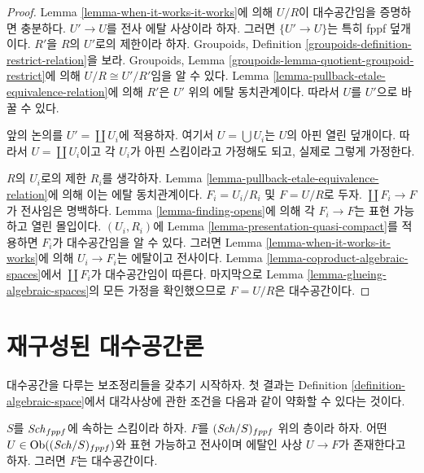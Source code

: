 \begin{proof}
Lemma \ref{lemma-when-it-works-it-works}에 의해 $U/R$이 대수공간임을
증명하면 충분하다. $U' \to U$를 전사 에탈 사상이라 하자.
그러면 $\{U' \to U\}$는 특히 fppf 덮개이다.
$R'$을 $R$의 $U'$로의 제한이라 하자. Groupoids, Definition
\ref{groupoids-definition-restrict-relation}을 보라.
Groupoids, Lemma \ref{groupoids-lemma-quotient-groupoid-restrict}에
의해 $U/R \cong U'/R'$임을 알 수 있다. Lemma
\ref{lemma-pullback-etale-equivalence-relation}에 의해 $R'$은
$U'$ 위의 에탈 동치관계이다. 따라서 $U$를 $U'$으로 바꿀 수 있다.

\medskip\noindent
앞의 논의를 $U' = \coprod U_i$에 적용하자. 여기서
$U = \bigcup U_i$는 $U$의 아핀 열린 덮개이다. 따라서
$U = \coprod U_i$이고 각 $U_i$가 아핀 스킴이라고 가정해도 되고,
실제로 그렇게 가정한다.

\medskip\noindent
$R$의 $U_i$로의 제한 $R_i$를 생각하자. Lemma
\ref{lemma-pullback-etale-equivalence-relation}에 의해 이는 에탈
동치관계이다. $F_i = U_i/R_i$ 및 $F = U/R$로 두자.
$\coprod F_i \to F$가 전사임은 명백하다. Lemma
\ref{lemma-finding-opens}에 의해 각 $F_i \to F$는 표현 가능하고
열린 몰입이다. $(U_i, R_i)$에 Lemma
\ref{lemma-presentation-quasi-compact}를 적용하면 $F_i$가 대수공간임을
알 수 있다. 그러면 Lemma \ref{lemma-when-it-works-it-works}에 의해
$U_i \to F_i$는 에탈이고 전사이다. Lemma
\ref{lemma-coproduct-algebraic-spaces}에서 $\coprod F_i$가 대수공간임이
따른다. 마지막으로 Lemma \ref{lemma-glueing-algebraic-spaces}의 모든
가정을 확인했으므로 $F = U/R$은 대수공간이다.
\end{proof}










\section{재구성된 대수공간론}
\label{section-algebraic-spaces-retrofitted}

\noindent
대수공간을 다루는 보조정리들을 갖추기 시작하자. 첫 결과는 Definition
\ref{definition-algebraic-space}에서 대각사상에 관한 조건을 다음과 같이
약화할 수 있다는 것이다.

\begin{lemma}
\label{lemma-etale-locally-representable-gives-space}
$S$를 $\mathit{Sch}_{fppf}$에 속하는 스킴이라 하자.
$F$를 $(\mathit{Sch}/S)_{fppf}$ 위의 층이라 하자. 어떤
$U \in \mathop{\mathrm{Ob}}\nolimits((\mathit{Sch}/S)_{fppf})$와 표현 가능하고 전사이며 에탈인 사상
$U \to F$가 존재한다고 하자. 그러면 $F$는 대수공간이다.
\end{lemma}

